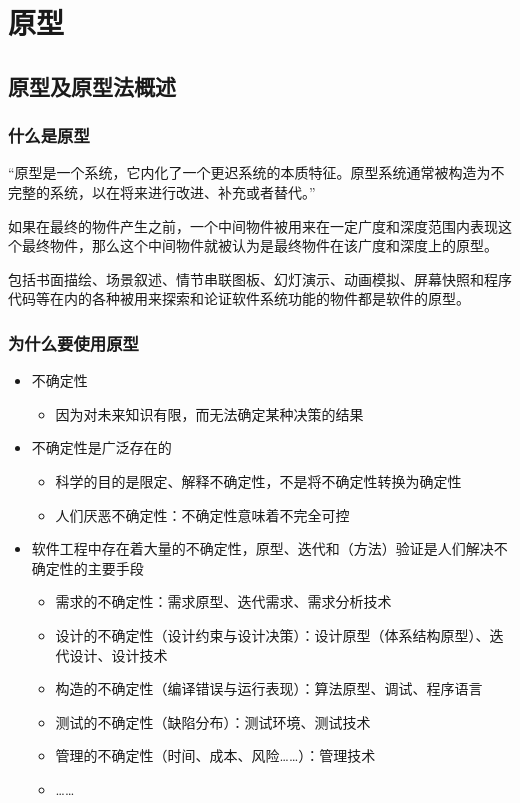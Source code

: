 \section{原型}

\subsection{原型及原型法概述}

\subsubsection{什么是原型}
“原型是一个系统，它内化了一个更迟系统的本质特征。原型系统通常被构造为不完整的系统，以在将来进行改进、补充或者替代。” 

如果在最终的物件产生之前，一个中间物件被用来在一定广度和深度范围内表现这个最终物件，那么这个中间物件就被认为是最终物件在该广度和深度上的原型。 

包括书面描绘、场景叙述、情节串联图板、幻灯演示、动画模拟、屏幕快照和程序代码等在内的各种被用来探索和论证软件系统功能的物件都是软件的原型。

\subsubsection{为什么要使用原型}
\begin{itemize}
    \item 不确定性
    \begin{itemize}
        \item 因为对未来知识有限，而无法确定某种决策的结果
    \end{itemize}
    \item 不确定性是广泛存在的
    \begin{itemize}
        \item 科学的目的是限定、解释不确定性，不是将不确定性转换为确定性
        \item 人们厌恶不确定性：不确定性意味着不完全可控
    \end{itemize}
    \item 软件工程中存在着大量的不确定性，原型、迭代和（方法）验证是人们解决不确定性的主要手段
    \begin{itemize}
        \item 需求的不确定性：需求原型、迭代需求、需求分析技术
        \item 设计的不确定性（设计约束与设计决策）：设计原型（体系结构原型）、迭代设计、设计技术
        \item 构造的不确定性（编译错误与运行表现）：算法原型、调试、程序语言
        \item 测试的不确定性（缺陷分布）：测试环境、测试技术
        \item 管理的不确定性（时间、成本、风险……）：管理技术
        \item ……
    \end{itemize}
\end{itemize}


